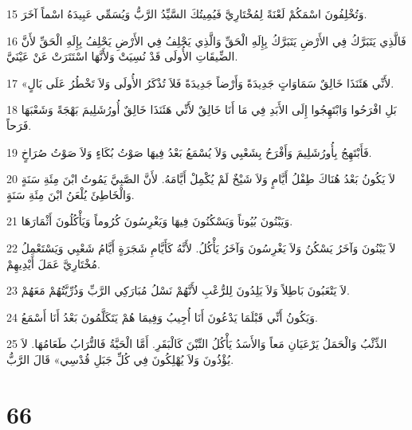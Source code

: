 \par 15 وَتُخْلِفُونَ اسْمَكُمْ لَعْنَةً لِمُخْتَارِيَّ فَيُمِيتُكَ السَّيِّدُ الرَّبُّ وَيُسَمِّي عَبِيدَهُ اسْماً آخَرَ.
\par 16 فَالَّذِي يَتَبَرَّكُ فِي الأَرْضِ يَتَبَرَّكُ بِإِلَهِ الْحَقِّ وَالَّذِي يَحْلِفُ فِي الأَرْضِ يَحْلِفُ بِإِلَهِ الْحَقِّ لأَنَّ الضِّيقَاتِ الأُولَى قَدْ نُسِيَتْ وَلأَنَّهَا اسْتَتَرَتْ عَنْ عَيْنَيَّ.
\par 17 «لأَنِّي هَئَنَذَا خَالِقٌ سَمَاوَاتٍ جَدِيدَةً وَأَرْضاً جَدِيدَةً فَلاَ تُذْكَرُ الأُولَى وَلاَ تَخْطُرُ عَلَى بَالٍ.
\par 18 بَلِ افْرَحُوا وَابْتَهِجُوا إِلَى الأَبَدِ فِي مَا أَنَا خَالِقٌ لأَنِّي هَئَنَذَا خَالِقٌ أُورُشَلِيمَ بَهْجَةً وَشَعْبَهَا فَرَحاً.
\par 19 فَأَبْتَهِجُ بِأُورُشَلِيمَ وَأَفْرَحُ بِشَعْبِي وَلاَ يُسْمَعُ بَعْدُ فِيهَا صَوْتُ بُكَاءٍ وَلاَ صَوْتُ صُرَاخٍ.
\par 20 لاَ يَكُونُ بَعْدُ هُنَاكَ طِفْلُ أَيَّامٍ وَلاَ شَيْخٌ لَمْ يُكْمِلْ أَيَّامَهُ. لأَنَّ الصَّبِيَّ يَمُوتُ ابْنَ مِئَةِ سَنَةٍ وَالْخَاطِئَ يُلْعَنُ ابْنَ مِئَةِ سَنَةٍ.
\par 21 وَيَبْنُونَ بُيُوتاً وَيَسْكُنُونَ فِيهَا وَيَغْرِسُونَ كُرُوماً وَيَأْكُلُونَ أَثْمَارَهَا.
\par 22 لاَ يَبْنُونَ وَآخَرُ يَسْكُنُ وَلاَ يَغْرِسُونَ وَآخَرُ يَأْكُلُ. لأَنَّهُ كَأَيَّامِ شَجَرَةٍ أَيَّامُ شَعْبِي وَيَسْتَعْمِلُ مُخْتَارِيَّ عَمَلَ أَيْدِيهِمْ.
\par 23 لاَ يَتْعَبُونَ بَاطِلاً وَلاَ يَلِدُونَ لِلرُّعْبِ لأَنَّهُمْ نَسْلُ مُبَارَكِي الرَّبِّ وَذُرِّيَّتُهُمْ مَعَهُمْ.
\par 24 وَيَكُونُ أَنِّي قَبْلَمَا يَدْعُونَ أَنَا أُجِيبُ وَفِيمَا هُمْ يَتَكَلَّمُونَ بَعْدُ أَنَا أَسْمَعُ.
\par 25 الذِّئْبُ وَالْحَمَلُ يَرْعَيَانِ مَعاً وَالأَسَدُ يَأْكُلُ التِّبْنَ كَالْبَقَرِ. أَمَّا الْحَيَّةُ فَالتُّرَابُ طَعَامُهَا. لاَ يُؤْذُونَ وَلاَ يُهْلِكُونَ فِي كُلِّ جَبَلِ قُدْسِي» قَالَ الرَّبُّ.

\chapter{66}

